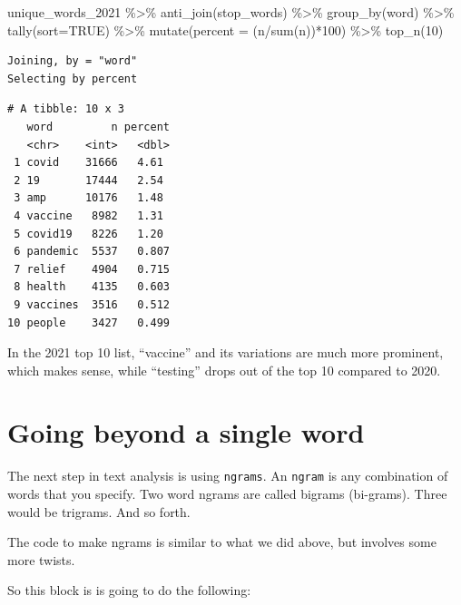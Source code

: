 \documentclass[
  letterpaper,
  DIV=11,
  numbers=noendperiod]{scrreprt}
\newenvironment{Shaded}{\begin{snugshade}}{\end{snugshade}}
\newcommand{\AttributeTok}[1]{\textcolor[rgb]{0.40,0.45,0.13}{#1}}
\newcommand{\ConstantTok}[1]{\textcolor[rgb]{0.56,0.35,0.01}{#1}}
\newcommand{\DecValTok}[1]{\textcolor[rgb]{0.68,0.00,0.00}{#1}}
\newcommand{\FunctionTok}[1]{\textcolor[rgb]{0.28,0.35,0.67}{#1}}
\newcommand{\NormalTok}[1]{\textcolor[rgb]{0.00,0.23,0.31}{#1}}
\newcommand{\SpecialCharTok}[1]{\textcolor[rgb]{0.37,0.37,0.37}{#1}}
\begin{document}
\begin{Shaded}
\begin{Highlighting}[]
\NormalTok{unique\_words\_2021 }\SpecialCharTok{\%\textgreater{}\%}
  \FunctionTok{anti\_join}\NormalTok{(stop\_words) }\SpecialCharTok{\%\textgreater{}\%}
  \FunctionTok{group\_by}\NormalTok{(word) }\SpecialCharTok{\%\textgreater{}\%}
  \FunctionTok{tally}\NormalTok{(}\AttributeTok{sort=}\ConstantTok{TRUE}\NormalTok{) }\SpecialCharTok{\%\textgreater{}\%}
  \FunctionTok{mutate}\NormalTok{(}\AttributeTok{percent =}\NormalTok{ (n}\SpecialCharTok{/}\FunctionTok{sum}\NormalTok{(n))}\SpecialCharTok{*}\DecValTok{100}\NormalTok{) }\SpecialCharTok{\%\textgreater{}\%}
  \FunctionTok{top\_n}\NormalTok{(}\DecValTok{10}\NormalTok{)}
\end{Highlighting}
\end{Shaded}

\begin{verbatim}
Joining, by = "word"
Selecting by percent
\end{verbatim}

\begin{verbatim}
# A tibble: 10 x 3
   word         n percent
   <chr>    <int>   <dbl>
 1 covid    31666   4.61 
 2 19       17444   2.54 
 3 amp      10176   1.48 
 4 vaccine   8982   1.31 
 5 covid19   8226   1.20 
 6 pandemic  5537   0.807
 7 relief    4904   0.715
 8 health    4135   0.603
 9 vaccines  3516   0.512
10 people    3427   0.499
\end{verbatim}

In the 2021 top 10 list, ``vaccine'' and its variations are much more
prominent, which makes sense, while ``testing'' drops out of the top 10
compared to 2020.

\hypertarget{going-beyond-a-single-word}{%
\section{Going beyond a single word}\label{going-beyond-a-single-word}}

The next step in text analysis is using \texttt{ngrams}. An
\texttt{ngram} is any combination of words that you specify. Two word
ngrams are called bigrams (bi-grams). Three would be trigrams. And so
forth.

The code to make ngrams is similar to what we did above, but involves
some more twists.

So this block is is going to do the following:
\end{document}
